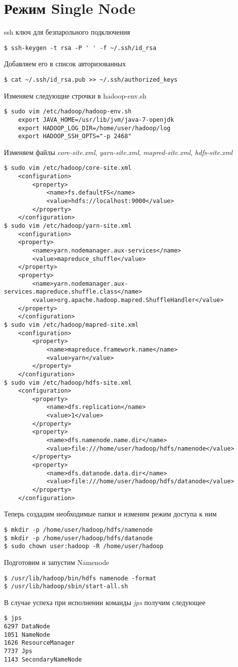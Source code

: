 \section{Режим Single Node}
 ssh ключ для безпарольного подключения
\begin{lstlisting}
$ ssh-keygen -t rsa -P ' ' -f ~/.ssh/id_rsa
\end{lstlisting}
Добавляем его в список авторизованных
\begin{lstlisting}
$ cat ~/.ssh/id_rsa.pub >> ~/.ssh/authorized_keys
\end{lstlisting}
Изменяем следующие строчки в hadoop-env.sh
\begin{lstlisting}
$ sudo vim /etc/hadoop/hadoop-env.sh
    export JAVA_HOME=/usr/lib/jvm/java-7-openjdk
    export HADOOP_LOG_DIR=/home/user/hadoop/log
    export HADOOP_SSH_OPTS="-p 2468"
\end{lstlisting}
Изменяем файлы \emph{core-site.xml}, \emph{yarn-site.xml}, \emph{mapred-site.xml}, \emph{hdfs-site.xml}
\begin{lstlisting}
$ sudo vim /etc/hadoop/core-site.xml
    <configuration>
        <property>
            <name>fs.defaultFS</name>
            <value>hdfs://localhost:9000</value>
        </property>
    </configuration>
$ sudo vim /etc/hadoop/yarn-site.xml
    <configuration>
    <property>
        <name>yarn.nodemanager.aux-services</name>
        <value>mapreduce_shuffle</value>
    </property>
    <property>
        <name>yarn.nodemanager.aux-services.mapreduce.shuffle.class</name>
        <value>org.apache.hadoop.mapred.ShuffleHandler</value>
    </property>
    </configuration>
$ sudo vim /etc/hadoop/mapred-site.xml
    <configuration>
        <property>
            <name>mapreduce.framework.name</name>
            <value>yarn</value>
        </property>
    </configuration>
$ sudo vim /etc/hadoop/hdfs-site.xml
    <configuration>
        <property>
            <name>dfs.replication</name>
            <value>1</value>
        </property>
        <property>
            <name>dfs.namenode.name.dir</name>
            <value>file:///home/user/hadoop/hdfs/namenode</value>
        </property>
        <property>
            <name>dfs.datanode.data.dir</name>
            <value>file:///home/user/hadoop/hdfs/datanode</value>
        </property>
    </configuration>
\end{lstlisting}
Теперь создадим необходимые папки и изменим режим доступа к ним
\begin{lstlisting}
$ mkdir -p /home/user/hadoop/hdfs/namenode
$ mkdir -p /home/user/hadoop/hdfs/datanode
$ sudo chown user:hadoop -R /home/user/hadoop
\end{lstlisting}
Подготовим и запустим Namenode
\begin{lstlisting}
$ /usr/lib/hadoop/bin/hdfs namenode -format
$ /usr/lib/hadoop/sbin/start-all.sh
\end{lstlisting}
В случае успеха при исполнении команды \emph{jps} получим следующее
\begin{lstlisting}
$ jps
6297 DataNode
1051 NameNode
1626 ResourceManager
7737 Jps
1143 SecondaryNameNode
\end{lstlisting}

